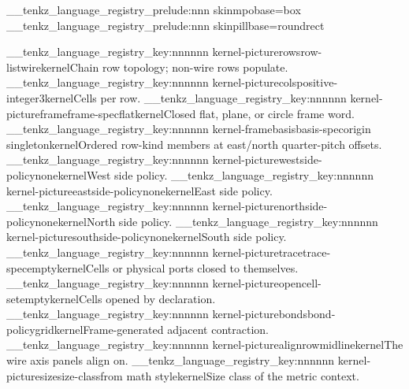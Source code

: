 \__tenkz_language_registry_prelude:nnn {skin}{mpo}{base=box}
\__tenkz_language_registry_prelude:nnn {skin}{pill}{base=roundrect}

\__tenkz_language_registry_key:nnnnnn {kernel-picture}{rows}{row-list}{{wire}}{kernel}{Chain row topology; non-wire rows populate.}
\__tenkz_language_registry_key:nnnnnn {kernel-picture}{cols}{positive-integer}{3}{kernel}{Cells per row.}
\__tenkz_language_registry_key:nnnnnn {kernel-picture}{frame}{frame-spec}{flat}{kernel}{Closed flat, plane, or circle frame word.}
\__tenkz_language_registry_key:nnnnnn {kernel-frame}{basis}{basis-spec}{origin singleton}{kernel}{Ordered row-kind members at east/north quarter-pitch offsets.}
\__tenkz_language_registry_key:nnnnnn {kernel-picture}{west}{side-policy}{none}{kernel}{West side policy.}
\__tenkz_language_registry_key:nnnnnn {kernel-picture}{east}{side-policy}{none}{kernel}{East side policy.}
\__tenkz_language_registry_key:nnnnnn {kernel-picture}{north}{side-policy}{none}{kernel}{North side policy.}
\__tenkz_language_registry_key:nnnnnn {kernel-picture}{south}{side-policy}{none}{kernel}{South side policy.}
\__tenkz_language_registry_key:nnnnnn {kernel-picture}{trace}{trace-spec}{empty}{kernel}{Cells or physical ports closed to themselves.}
\__tenkz_language_registry_key:nnnnnn {kernel-picture}{open}{cell-set}{empty}{kernel}{Cells opened by declaration.}
\__tenkz_language_registry_key:nnnnnn {kernel-picture}{bonds}{bond-policy}{grid}{kernel}{Frame-generated adjacent contraction.}
\__tenkz_language_registry_key:nnnnnn {kernel-picture}{align}{row}{midline}{kernel}{The wire axis panels align on.}
\__tenkz_language_registry_key:nnnnnn {kernel-picture}{size}{size-class}{from math style}{kernel}{Size class of the metric context.}
